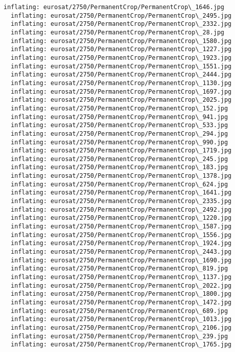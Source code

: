 \documentclass[11pt]{article}
\begin{document}
\begin{Verbatim}[commandchars=\\\{\}]
  inflating: eurosat/2750/PermanentCrop/PermanentCrop\_1646.jpg
  inflating: eurosat/2750/PermanentCrop/PermanentCrop\_2495.jpg
  inflating: eurosat/2750/PermanentCrop/PermanentCrop\_2332.jpg
  inflating: eurosat/2750/PermanentCrop/PermanentCrop\_28.jpg
  inflating: eurosat/2750/PermanentCrop/PermanentCrop\_1580.jpg
  inflating: eurosat/2750/PermanentCrop/PermanentCrop\_1227.jpg
  inflating: eurosat/2750/PermanentCrop/PermanentCrop\_1923.jpg
  inflating: eurosat/2750/PermanentCrop/PermanentCrop\_1551.jpg
  inflating: eurosat/2750/PermanentCrop/PermanentCrop\_2444.jpg
  inflating: eurosat/2750/PermanentCrop/PermanentCrop\_1130.jpg
  inflating: eurosat/2750/PermanentCrop/PermanentCrop\_1697.jpg
  inflating: eurosat/2750/PermanentCrop/PermanentCrop\_2025.jpg
  inflating: eurosat/2750/PermanentCrop/PermanentCrop\_152.jpg
  inflating: eurosat/2750/PermanentCrop/PermanentCrop\_941.jpg
  inflating: eurosat/2750/PermanentCrop/PermanentCrop\_533.jpg
  inflating: eurosat/2750/PermanentCrop/PermanentCrop\_294.jpg
  inflating: eurosat/2750/PermanentCrop/PermanentCrop\_990.jpg
  inflating: eurosat/2750/PermanentCrop/PermanentCrop\_1719.jpg
  inflating: eurosat/2750/PermanentCrop/PermanentCrop\_245.jpg
  inflating: eurosat/2750/PermanentCrop/PermanentCrop\_183.jpg
  inflating: eurosat/2750/PermanentCrop/PermanentCrop\_1378.jpg
  inflating: eurosat/2750/PermanentCrop/PermanentCrop\_624.jpg
  inflating: eurosat/2750/PermanentCrop/PermanentCrop\_1641.jpg
  inflating: eurosat/2750/PermanentCrop/PermanentCrop\_2335.jpg
  inflating: eurosat/2750/PermanentCrop/PermanentCrop\_2492.jpg
  inflating: eurosat/2750/PermanentCrop/PermanentCrop\_1220.jpg
  inflating: eurosat/2750/PermanentCrop/PermanentCrop\_1587.jpg
  inflating: eurosat/2750/PermanentCrop/PermanentCrop\_1556.jpg
  inflating: eurosat/2750/PermanentCrop/PermanentCrop\_1924.jpg
  inflating: eurosat/2750/PermanentCrop/PermanentCrop\_2443.jpg
  inflating: eurosat/2750/PermanentCrop/PermanentCrop\_1690.jpg
  inflating: eurosat/2750/PermanentCrop/PermanentCrop\_819.jpg
  inflating: eurosat/2750/PermanentCrop/PermanentCrop\_1137.jpg
  inflating: eurosat/2750/PermanentCrop/PermanentCrop\_2022.jpg
  inflating: eurosat/2750/PermanentCrop/PermanentCrop\_1800.jpg
  inflating: eurosat/2750/PermanentCrop/PermanentCrop\_1472.jpg
  inflating: eurosat/2750/PermanentCrop/PermanentCrop\_689.jpg
  inflating: eurosat/2750/PermanentCrop/PermanentCrop\_1013.jpg
  inflating: eurosat/2750/PermanentCrop/PermanentCrop\_2106.jpg
  inflating: eurosat/2750/PermanentCrop/PermanentCrop\_239.jpg
  inflating: eurosat/2750/PermanentCrop/PermanentCrop\_1765.jpg

\end{Verbatim}
\end{document}
